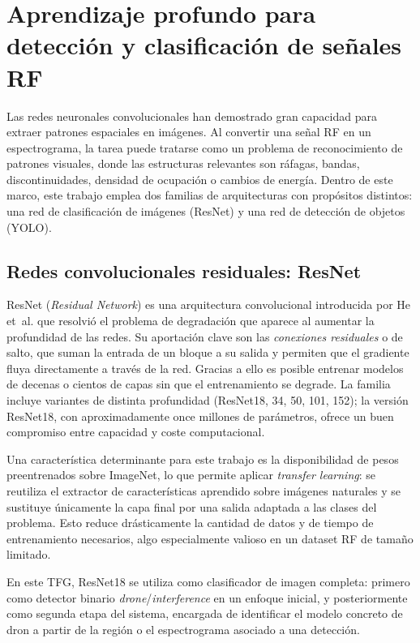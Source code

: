 \section{Aprendizaje profundo para detección y clasificación de señales RF}
\label{sec:deep_rf}

Las redes neuronales convolucionales han demostrado gran capacidad para extraer patrones espaciales en imágenes. Al convertir una señal RF en un espectrograma, la tarea puede tratarse como un problema de reconocimiento de patrones visuales, donde las estructuras relevantes son ráfagas, bandas, discontinuidades, densidad de ocupación o cambios de energía. Dentro de este marco, este trabajo emplea dos familias de arquitecturas con propósitos distintos: una red de clasificación de imágenes (ResNet) y una red de detección de objetos (YOLO).

\subsection{Redes convolucionales residuales: ResNet}
\label{subsec:resnet}

ResNet (\emph{Residual Network}) es una arquitectura convolucional introducida por He et~al. \cite{he2016resnet} que resolvió el problema de degradación que aparece al aumentar la profundidad de las redes. Su aportación clave son las \emph{conexiones residuales} o de salto, que suman la entrada de un bloque a su salida y permiten que el gradiente fluya directamente a través de la red. Gracias a ello es posible entrenar modelos de decenas o cientos de capas sin que el entrenamiento se degrade. La familia incluye variantes de distinta profundidad (ResNet18, 34, 50, 101, 152); la versión ResNet18, con aproximadamente once millones de parámetros, ofrece un buen compromiso entre capacidad y coste computacional.

Una característica determinante para este trabajo es la disponibilidad de pesos preentrenados sobre ImageNet, lo que permite aplicar \emph{transfer learning}: se reutiliza el extractor de características aprendido sobre imágenes naturales y se sustituye únicamente la capa final por una salida adaptada a las clases del problema. Esto reduce drásticamente la cantidad de datos y de tiempo de entrenamiento necesarios, algo especialmente valioso en un dataset RF de tamaño limitado.

En este TFG, ResNet18 se utiliza como clasificador de imagen completa: primero como detector binario \emph{drone}/\emph{interference} en un enfoque inicial, y posteriormente como segunda etapa del sistema, encargada de identificar el modelo concreto de dron a partir de la región o el espectrograma asociado a una detección.

